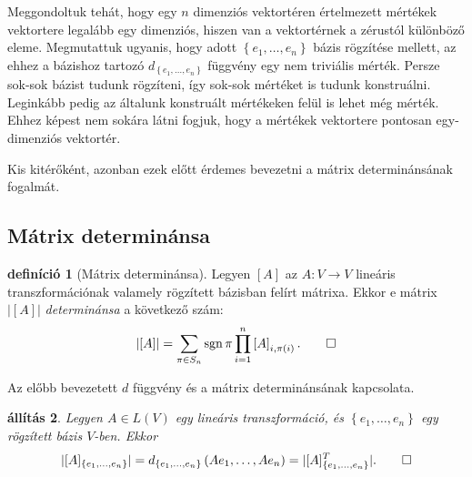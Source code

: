 \documentclass[9pt, a4paper, showtrims]{memoir}
\theoremstyle{plain}
\newtheorem{proposition}{állítás}[chapter]
\theoremstyle{remark}
\theoremstyle{definition}
\newtheorem{definition}[proposition]{definíció}
\DeclareMathOperator{\sgn}{sgn}
\begin{document}
Meggondoltuk tehát, hogy egy $n$ dimenziós vektortéren értelmezett mértékek vektortere legalább egy dimenziós,
hiszen van a vektortérnek a zérustól különböző eleme.
Megmutattuk ugyanis, hogy adott $\left\{ e_1,\dots,e_n \right\}$ bázis rögzítése mellett, 
az ehhez a bázishoz tartozó $d_{\left\{ e_1,\dots,e_n \right\}}$ függvény egy nem triviális mérték.
Persze sok-sok bázist tudunk rögzíteni, így sok-sok mértéket is tudunk konstruálni.
Leginkább pedig az általunk konstruált mértékeken felül is lehet még mérték.
Ehhez képest nem sokára látni fogjuk, 
hogy a mértékek vektortere pontosan egy-dimenziós vektortér.

Kis kitérőként, azonban ezek előtt érdemes bevezetni a mátrix determinánsának fogalmát.

\subsection{Mátrix determinánsa}
\begin{definition}[Mátrix determinánsa]
    Legyen 
    $\left[ A\right]$ az $A:V\rightarrow V$ 
    lineáris transzformációnak valamely rögzített bázisban felírt mátrixa. 
    Ekkor e mátrix $\left| \left[ A\right] \right|$ \emph{determinánsa} a következő szám:
    \[
    \left| \left[ A\right] \right| 
    =
    \sum_{\pi \in S_{n}}\sgn\pi\prod_{i=1}^n\left[ A\right]_{i,\pi \left( i\right) }.\qedhere
    \]
\end{definition}
Az előbb bevezetett $d$ függvény és a mátrix determinánsának kapcsolata.
\begin{proposition}
    Legyen $A\in L\left( V \right)$ egy lineáris transzformáció, és $\left\{ e_1,\dots,e_n \right\}$
    egy rögzített bázis $V$-ben.
    Ekkor
    \[
        |[A]_{\left\{e_1,\dots,e_n \right\}}|
        =
        d_{\left\{e_1,\dots,e_n \right\}}\left( Ae_1,\dots,Ae_n \right)
        =
        |[A]^T_{\left\{e_1,\dots,e_n \right\}}|.\qedhere
    \]
\end{proposition}
\end{document}
